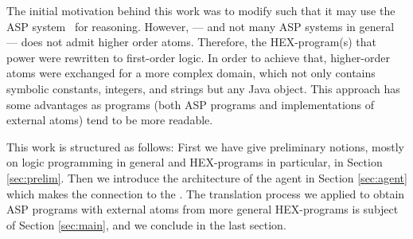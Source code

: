 The initial motivation behind this work was to modify \ah such that it may use the \al ASP system~\cite{blend} for reasoning. However, \al --- and not many ASP systems in general --- does not admit higher order atoms. Therefore, the HEX-program(s) that power \ah were rewritten to first-order logic. In order to achieve that, higher-order atoms were exchanged for a more complex domain, which not only contains symbolic constants, integers, and strings but any Java object. This approach has some advantages as programs (both ASP programs and implementations of external atoms) tend to be more readable.

This work is structured as follows: First we have give preliminary notions, mostly on logic programming in general and HEX-programs in particular, in Section \ref{sec:prelim}. Then we introduce the architecture of the \ah agent in Section \ref{sec:agent} which makes the connection to the \abc. The translation process we applied to obtain ASP programs with external atoms from more general HEX-programs is subject of Section \ref{sec:main}, and we  conclude in the last section.